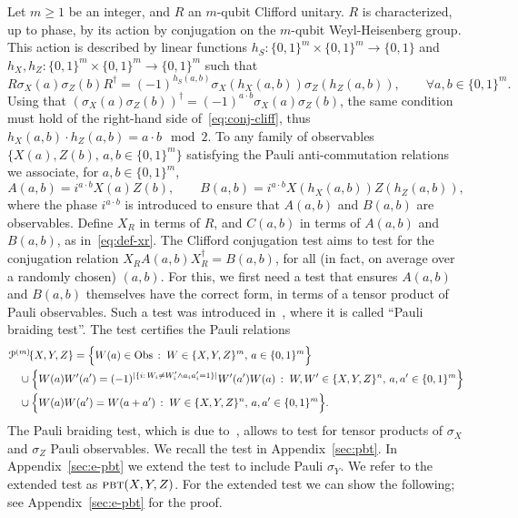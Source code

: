 Let $m\geq 1$ be an integer, and $R$ an $m$-qubit Clifford unitary. $R$ is characterized, up to phase, by its action by conjugation on the $m$-qubit Weyl-Heisenberg group. This action is described  by linear functions $h_S:\{0,1\}^m\times\{0,1\}^m \to \{0,1\}$ and $h_X,h_Z:\{0,1\}^m\times\{0,1\}^m \to \{0,1\}^m$ such that
\begin{equation}\label{eq:conj-cliff}
R \sigma_X(a)\sigma_Z(b) R^\dagger = (-1)^{h_S(a,b)}\sigma_X(h_X(a,b))\sigma_Z(h_Z(a,b)),\qquad\forall a,b\in\{0,1\}^m.
\end{equation}
Using that $(\sigma_X(a)\sigma_Z(b))^\dagger = (-1)^{a\cdot b} \sigma_X(a)\sigma_Z(b)$, the same condition must hold of the right-hand side of~\eqref{eq:conj-cliff}, thus $h_X(a,b)\cdot h_Z(a,b) = a\cdot b\mod 2$. 
 To any family of observables $\{X(a),Z(b),\,a,b\in\{0,1\}^m\}$ satisfying the Pauli anti-commutation relations we associate,  for $a,b\in\{0,1\}^m$,
\begin{equation}\label{eq:def-control-c}
A(a,b) = i^{a\cdot b}X(a)Z(b), \qquad B(a,b) = i^{a\cdot b}X(h_X(a,b))Z(h_Z(a,b)),
\end{equation}
where the phase $i^{a\cdot b}$ is introduced to ensure that $A(a,b)$ and $B(a,b)$ are observables. Define $X_R$ in terms of $R$, and $C(a,b)$ in terms of $A(a,b)$ and $B(a,b)$, as in~\eqref{eq:def-xr}. 
The Clifford conjugation test aims to test for the conjugation relation $X_RA(a,b)X_R^\dagger = B(a,b)$, for all (in fact, on average over a randomly chosen) $(a,b)$. For this, we first need a test that ensures $A(a,b)$ and $B(a,b)$ themselves have the correct form, in terms of a tensor product of Pauli observables. Such a test was introduced in~\cite{natarajan2016robust}, where it is called ``Pauli braiding test''. The test certifies the Pauli relations 
\begin{align*}
& {\mathcal{P}^{(m)}\!}\{X,Y,Z\} = \Big\{ W(a)\in\mathrm{Obs}\,:\;W \in \{X,Y,Z\}^m,\,a\in\{0,1\}^m\Big\} \\
&\quad\cup \Big\{W(a)W'(a')=(-1)^{|\{i:\,W_i\neq W'_i \wedge a_ia'_i=1\}|} W'(a')W(a)\,:\; W,W' \in \{X,Y,Z\}^n,\, a,a'\in\{0,1\}^m\Big\}\\
&\quad \cup\Big\{ W(a)W(a')=W(a+a')\,:\;W\in\{X,Y,Z\}^n,\, a,a'\in\{0,1\}^m\Big\}.
\end{align*}
The Pauli braiding test, which is due to~\cite{natarajan2016robust}, allows to test for tensor products of $\sigma_X$ and $\sigma_Z$ Pauli observables. We recall the test in Appendix~\ref{sec:pbt}. In Appendix~\ref{sec:e-pbt} we extend the test to include Pauli $\sigma_Y$. We refer to the extended test as $\textsc{pbt}(X,Y,Z)$. For the extended test we can show the following; see Appendix~\ref{sec:e-pbt} for the proof.

